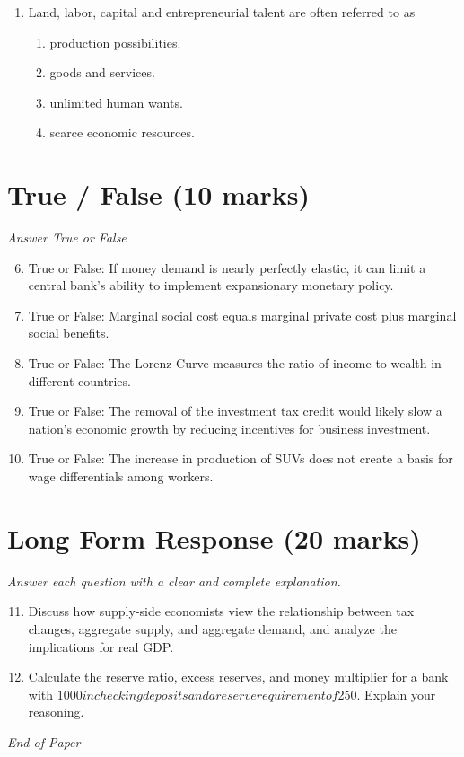 \documentclass[12pt]{article}
\begin{document}
\begin{enumerate}[label=\arabic*.]
\begin{enumerate}[label=(\alph*)]
    \item More rapid consumption of natural resources.
    \item Higher adult illiteracy rates.
    \item A falling stock of capital goods.
    \item Investment tax credits.
\end{enumerate}
\item Land, labor, capital and entrepreneurial talent are often referred to as
\begin{enumerate}[label=(\alph*)]
    \item production possibilities.
    \item goods and services.
    \item unlimited human wants.
    \item scarce economic resources.
\end{enumerate}
\end{enumerate}

\section*{True / False (10 marks)}
\textit{Answer True or False}
\begin{enumerate}[label=\arabic*.]
\setcounter{enumi}{5}
\item True or False: If money demand is nearly perfectly elastic, it can limit a central bank's ability to implement expansionary monetary policy.
\item True or False: Marginal social cost equals marginal private cost plus marginal social benefits.
\item True or False: The Lorenz Curve measures the ratio of income to wealth in different countries.
\item True or False: The removal of the investment tax credit would likely slow a nation's economic growth by reducing incentives for business investment.
\item True or False: The increase in production of SUVs does not create a basis for wage differentials among workers.
\end{enumerate}

\section*{Long Form Response (20 marks)}
\textit{Answer each question with a clear and complete explanation.}
\begin{enumerate}[label=\arabic*.]
\setcounter{enumi}{10}
\item Discuss how supply-side economists view the relationship between tax changes, aggregate supply, and aggregate demand, and analyze the implications for real GDP.
\item Calculate the reserve ratio, excess reserves, and money multiplier for a bank with $1000 in checking deposits and a reserve requirement of $250. Explain your reasoning.
\end{enumerate}

\vfill
\noindent\textit{End of Paper}
\end{document}
